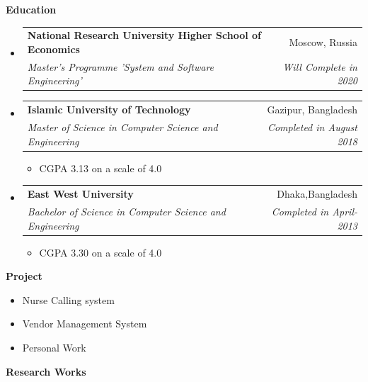 \documentclass[letterpaper,10pt]{article}
\makeatletter
\newcommand{\resitem}[1]{\item #1 \vspace{-2pt}}
\newcommand{\resheading}[1]{{\large \colorbox{mygrey}{\begin{minipage}{\textwidth}{\textbf{#1 \vphantom{p\^{E}}}}\end{minipage}}}}
\newcommand{\ressubheading}[4]{
\begin{tabular*}{6.5in}{l@{\extracolsep{\fill}}r}
		\textbf{#1} & #2 \\
		\textit{#3} & \textit{#4} \\
\end{tabular*}\vspace{-6pt}}
\makeatother
\begin{document}
\resheading{Education}
\begin{itemize}
\item
	\ressubheading{National Research University Higher School of Economics}{Moscow, Russia}{Master’s Programme 'System and Software Engineering'}{Will Complete in 2020}


\item
	\ressubheading{Islamic University of Technology}{Gazipur, Bangladesh}{Master of Science in Computer Science and Engineering }{Completed in August 2018}
\begin{itemize}

		\item  CGPA 3.13  on a scale of 4.0

	\end{itemize}
	
\item
	\ressubheading{East West University}{Dhaka,Bangladesh}{Bachelor of Science in Computer Science and Engineering}{Completed in April-2013}
	\begin{itemize}
		\item  CGPA 3.30 on a scale of 4.0

	\end{itemize}


\end{itemize}

\resheading{Project}

\begin{itemize}
\resitem{Nurse Calling system}
\resitem{Vendor Management System}
\resitem{Personal Work}
\end{itemize}

\resheading{Research Works}
\end{document}
